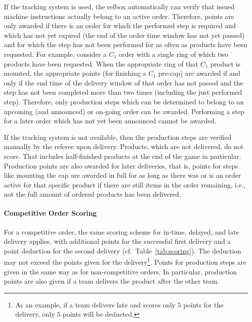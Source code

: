 \documentclass[12pt,twoside]{article}
\newcommand{\reftab}[1]{Table~\ref{#1}}
\begin{document}
If the tracking system is used, the \ac{refbox} automatically can verify that
issued machine instructions actually belong to an active order.
Therefore, points are only awarded if there is an order for which the
performed step is required and which has not yet expired (the end of
the order time window has not yet passed) and for which the step has
not been performed for as often as products have been requested. For
example, consider a $C_1$ order with a single ring of which two
products have been requested. When the appropriate ring of that $C_1$
product is mounted, the appropriate points (for finishing a $C_1$
pre-cap) are awarded if and only if the end time of the delivery
window of that order has not passed and the step has not been
completed more than two times (including the just performed
step). Therefore, only production steps which can be determined to
belong to an upcoming (and announced) or on-going order can be
awarded. Performing a step for a later order which has not yet been
announced cannot be awarded.

If the tracking system is not available, then the production steps are
verified manually by the referee upon delivery.
Products, which are not delivered, do not score. That includes half-finished
products at the end of the game in particular. Production points are
also awarded for later deliveries, that is, points for steps like
mounting the cap are awarded in full for as long as there was or is
an order active for that specific product if there are still items
in the order remaining, i.e., not the full amount of ordered products
has been delivered.
%

\paragraph{Competitive Order Scoring}
For a competitive order, the same scoring scheme for in-time, delayed, and late
delivery applies, with additional points for the successful first delivery and a
point deduction for the second delivery (cf.~\reftab{tab:scoring}). The
deduction may not exceed the points given for the delivery\footnote{As an
example, if a team delivers late and scores only $5$ points for the delivery,
only $5$ points will be deducted.}. Points for production steps are given in the
same way as for non-competitive orders. In particular, production points are
also given if a team delivers the product after the other team.
\end{document}

